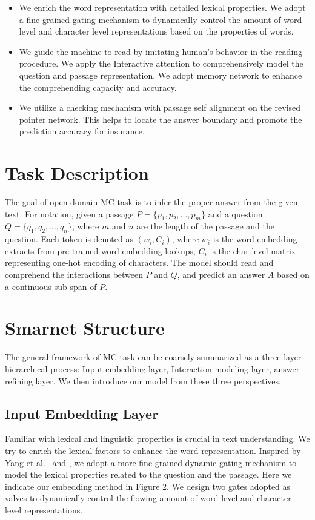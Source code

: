 \documentclass[letterpaper]{article} %
\begin{document}
\begin{itemize}
	\item We enrich the word representation with detailed lexical properties. We adopt a fine-grained gating mechanism to dynamically control the amount of word level and character level representations based on the properties of words.
	\item We guide the machine to read by imitating human's behavior in the reading procedure. We apply the Interactive attention to comprehensively model the question and passage representation. We adopt memory network to enhance the comprehending capacity and accuracy. 
	\item We utilize a checking mechanism with passage self alignment on the revised pointer network. This helps to locate the answer boundary and promote the prediction accuracy for insurance. 
\end{itemize}
 
 \section{Task Description}
The goal of open-domain MC task is to infer the proper answer from the given text. For notation, given a passage $P=\{p_1,p_2,...,p_m\}$ and a question $Q=\{q_1,q_2,...,q_n\}$, where $m$ and $n $ are the length of the passage and the question. Each token is denoted as $(w_i,C_i)$, where $w_i$ is the word embedding extracts from pre-trained word embedding lookups, $C_i$ is the char-level matrix representing one-hot encoding of characters. The model should read and comprehend the interactions between $P$ and $Q$, and predict an answer $A$ based on a continuous sub-span of $P$. 
 
 \section{ Smarnet Structure}
 The general framework of MC task can be coarsely summarized as a three-layer hierarchical process: Input embedding layer, Interaction modeling layer, answer refining layer. We then introduce our model from these three perspectives. 

 \subsection{Input Embedding Layer}
  Familiar with lexical and linguistic properties is crucial in text understanding. We try to enrich the lexical factors to enhance the word representation. Inspired by Yang et al.~\cite{Yang2016Words} \cite{Monsalve2012Lexical} \cite{Liu2017Structural} and \cite{chen2017reading}, we adopt a more fine-grained dynamic gating mechanism to model the lexical properties related to the question and the passage. Here we indicate our embedding method in Figure 2. We design two gates adopted as valves to dynamically control the flowing amount of word-level and character-level representations. 
  
\end{document}
